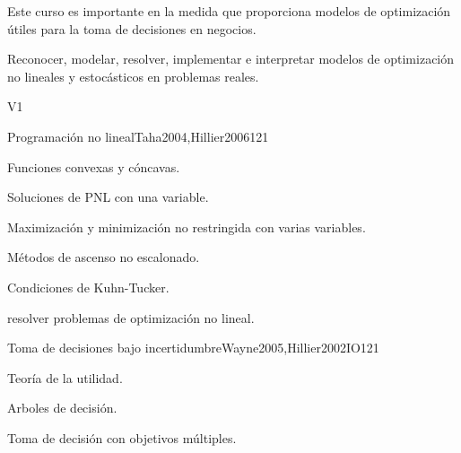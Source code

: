 \begin{syllabus}


\begin{justification}
Este curso es importante en la medida que proporciona modelos de optimización útiles para la toma de decisiones en negocios.
\end{justification}

\begin{goals}
\item Reconocer, modelar, resolver, implementar e interpretar modelos de optimización no lineales y estocásticos en problemas reales.
\end{goals}

\begin{outcomes}{V1}
\end{outcomes}

\begin{unit}{Programación no lineal}{}{Taha2004,Hillier2006}{12}{1}
   \begin{topics}
      \item Funciones convexas y cóncavas.
      \item Soluciones de PNL con una variable.
      \item Maximización y minimización no restringida con varias variables.
      \item Métodos de ascenso no escalonado.
      \item Condiciones de Kuhn-Tucker.
   \end{topics}

   \begin{learningoutcomes}
      \item resolver problemas de optimización no lineal.
   \end{learningoutcomes}
\end{unit}

\begin{unit}{Toma de decisiones bajo incertidumbre}{}{Wayne2005,Hillier2002IO}{12}{1}
   \begin{topics}
      \item Teoría de la utilidad.
      \item Arboles de decisión.
      \item Toma de decisión con objetivos múltiples.
   \end{topics}


\end{unit}
\end{syllabus}
